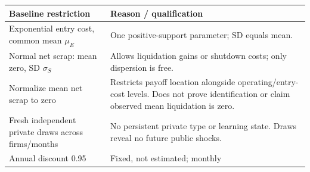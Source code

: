 \documentclass[11pt,]{article}
\begin{document}
\begin{longtable}[]{@{}ll@{}}
\toprule
\begin{minipage}[b]{0.32\columnwidth}\raggedright\strut
Baseline restriction\strut
\end{minipage} & \begin{minipage}[b]{0.62\columnwidth}\raggedright\strut
Reason / qualification\strut
\end{minipage}\tabularnewline
\midrule
\endhead
\begin{minipage}[t]{0.32\columnwidth}\raggedright\strut
Exponential entry cost, common mean \(\mu_E\)\strut
\end{minipage} & \begin{minipage}[t]{0.62\columnwidth}\raggedright\strut
One positive-support parameter; SD equals mean.\strut
\end{minipage}\tabularnewline
\begin{minipage}[t]{0.32\columnwidth}\raggedright\strut
Normal net scrap: mean zero, SD \(\sigma_S\)\strut
\end{minipage} & \begin{minipage}[t]{0.62\columnwidth}\raggedright\strut
Allows liquidation gains or shutdown costs; only dispersion is
free.\strut
\end{minipage}\tabularnewline
\begin{minipage}[t]{0.32\columnwidth}\raggedright\strut
Normalize mean net scrap to zero\strut
\end{minipage} & \begin{minipage}[t]{0.62\columnwidth}\raggedright\strut
Restricts payoff location alongside operating/entry-cost levels. Does
not prove identification or claim observed mean liquidation is
zero.\strut
\end{minipage}\tabularnewline
\begin{minipage}[t]{0.32\columnwidth}\raggedright\strut
Fresh independent private draws across firms/months\strut
\end{minipage} & \begin{minipage}[t]{0.62\columnwidth}\raggedright\strut
No persistent private type or learning state. Draws reveal no future
public shocks.\strut
\end{minipage}\tabularnewline
\begin{minipage}[t]{0.32\columnwidth}\raggedright\strut
Annual discount 0.95\strut
\end{minipage} & \begin{minipage}[t]{0.62\columnwidth}\raggedright\strut
Fixed, not estimated; monthly

\end{minipage}
\end{longtable}
\end{document}
